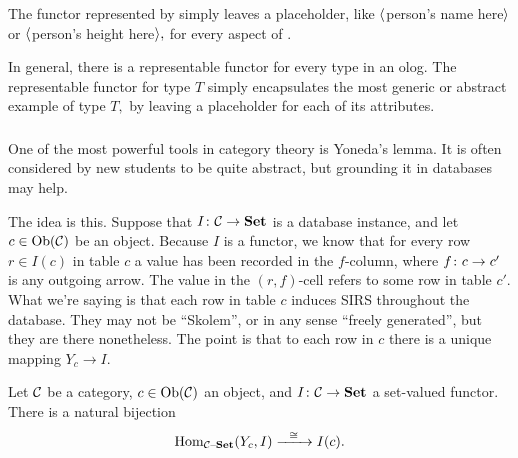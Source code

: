 \documentclass[CT4S-EN-RU]{subfiles}
\begin{document}
\begin{sloganENG}
The functor represented by  simply leaves a placeholder, like $\langle$person's name here$\rangle$ or $\langle$person's height here$\rangle,$ for every aspect of . 

In general, there is a representable functor for every type in an olog. The representable functor for type $T$ simply encapsulates the most generic or abstract example of type $T,$ by leaving a placeholder for each of its attributes.
\end{sloganENG}

\begin{sloganRUS}
\end{sloganRUS}


\subsubsection{}\label{sec:yoneda}

\begin{blockENG}
One of the most powerful tools in category theory is Yoneda's lemma. It is often considered by new students to be quite abstract, but grounding it in databases may help.
\end{blockENG}

\begin{blockRUS}
\end{blockRUS}

\begin{blockENG}
The idea is this. Suppose that $I\colon\mathcal{C}\rightarrow{\mathbf{Set}}$ is a database instance, and let $c\in\operatorname{Ob}(\mathcal{C})$ be an object. Because $I$ is a functor, we know that for every row $r\in I(c)$ in table $c$ a value has been recorded in the $f$-column, where $f\colon c\rightarrow c'$ is any outgoing arrow. The value in the $(r,f)$-cell refers to some row in table $c'.$ What we're saying is that each row in table $c$ induces SIRS throughout the database. They may not be “Skolem”, or in any sense “freely generated”, but they are there nonetheless. The point is that to each row in $c$ there is a unique mapping $Y_c\to I.$ 
\end{blockENG}

\begin{blockRUS}
\end{blockRUS}

\begin{lemmaENG}\label{lemma:Yoneda}
Let $\mathcal{C}$ be a category, $c\in\operatorname{Ob}(\mathcal{C})$ an object, and $I\colon\mathcal{C}\rightarrow{\mathbf{Set}}$ a set-valued functor. There is a natural bijection $$\operatorname{Hom}_{\mathcal{C}{\text \textendash}{\mathbf{Set}}}(Y_c,I)\xrightarrow{\ \ \cong\ \ }I(c).$$
\end{lemmaENG}
\end{document}
